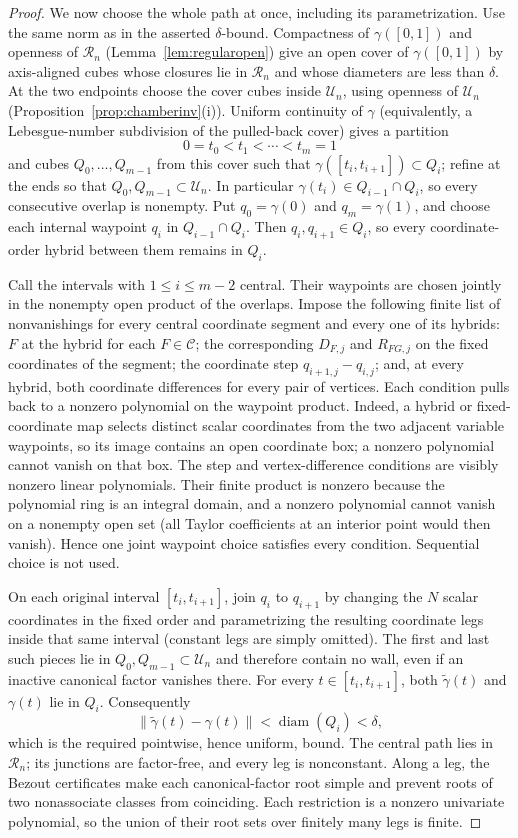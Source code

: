 \begin{proof}
We now choose the whole path at once, including its parametrization. Use the
same norm as in the asserted $\delta$-bound. Compactness of $\gamma([0,1])$
and openness of $\mathcal R_n$ (Lemma~\ref{lem:regularopen}) give an open
cover of $\gamma([0,1])$ by axis-aligned cubes whose closures lie in
$\mathcal R_n$ and whose diameters are less than $\delta$. At the two
endpoints choose the cover cubes inside $\mathcal U_n$, using openness of
$\mathcal U_n$ (Proposition~\ref{prop:chamberinv}(i)). Uniform continuity of $\gamma$
(equivalently, a Lebesgue-number subdivision of the pulled-back cover) gives
a partition
\[
 0=t_0<t_1<\cdots<t_m=1
\]
and cubes $Q_0,\ldots,Q_{m-1}$ from this cover such that
$\gamma([t_i,t_{i+1}])\subset Q_i$; refine at the ends so that
$Q_0,Q_{m-1}\subset\mathcal U_n$. In particular
$\gamma(t_i)\in Q_{i-1}\cap Q_i$, so every consecutive overlap is nonempty.
Put $q_0=\gamma(0)$ and $q_m=\gamma(1)$, and choose each internal waypoint
$q_i$ in $Q_{i-1}\cap Q_i$. Then $q_i,q_{i+1}\in Q_i$, so every
coordinate-order hybrid between them remains in $Q_i$.

Call the intervals with $1\leq i\leq m-2$ central. Their waypoints are chosen
jointly in the nonempty open product of the overlaps. Impose the following
finite list of nonvanishings for every central
coordinate segment and every one of its hybrids: $F$ at the hybrid for each
$F\in\mathcal C$; the corresponding $D_{F,j}$ and $R_{FG,j}$ on the fixed
coordinates of the segment; the coordinate step
$q_{i+1,j}-q_{i,j}$; and, at every hybrid, both coordinate differences for
every pair of vertices. Each condition pulls back to a nonzero polynomial on
the waypoint product. Indeed, a hybrid or fixed-coordinate map selects distinct
scalar coordinates from the two adjacent variable waypoints, so its image
contains an open coordinate box; a nonzero polynomial cannot vanish on that
box. The step and vertex-difference conditions are visibly nonzero linear
polynomials. Their finite product is nonzero because the polynomial ring is an
integral domain, and a nonzero polynomial cannot vanish on a nonempty open set
(all Taylor coefficients at an interior point would then vanish). Hence one
joint waypoint choice satisfies every condition. Sequential choice is not used.

On each original interval $[t_i,t_{i+1}]$, join $q_i$ to $q_{i+1}$ by
changing the $N$ scalar coordinates in the fixed order and parametrizing the
resulting coordinate legs inside that same interval (constant legs are simply
omitted). The first and last such pieces lie in
$Q_0,Q_{m-1}\subset\mathcal U_n$ and therefore contain no wall, even if an
inactive canonical factor vanishes there. For every $t\in[t_i,t_{i+1}]$, both
$\tilde\gamma(t)$ and $\gamma(t)$ lie in $Q_i$. Consequently
\[
 \|\tilde\gamma(t)-\gamma(t)\|<\operatorname{diam}(Q_i)<\delta,
\]
which is the required pointwise, hence uniform, bound. The central path lies
in $\mathcal R_n$; its junctions are factor-free, and every leg is nonconstant.
Along a leg, the Bezout certificates make each canonical-factor root simple
and prevent roots of two nonassociate classes from coinciding. Each
restriction is a nonzero univariate polynomial, so the union of their root
sets over finitely many legs is finite.


\end{proof}
